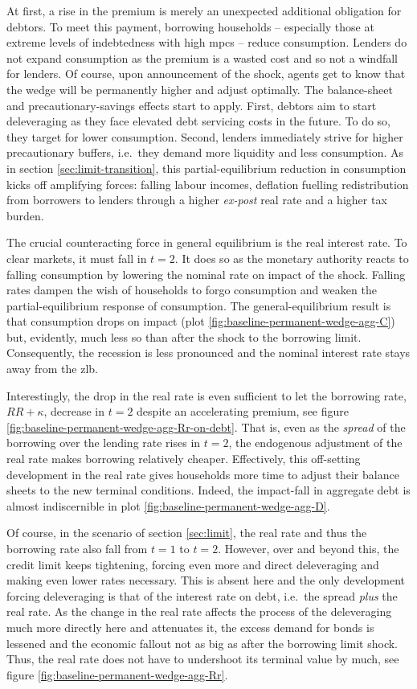 \documentclass[a4paper,12pt]{article} %
\numberwithin{equation}{section} %
\numberwithin{figure}{section}
\numberwithin{table}{section}
\begin{document}
At first, a rise in the premium is merely an unexpected additional obligation for debtors. To meet this payment, borrowing households -- especially those at extreme levels of indebtedness with high \Gls{mpc}s -- reduce consumption. Lenders do not expand consumption as the premium is a wasted cost and so not a windfall for lenders. Of course, upon announcement of the shock, agents get to know that the wedge will be permanently higher and adjust optimally. The balance-sheet and precautionary-savings effects start to apply. First, debtors aim to start deleveraging as they face elevated debt servicing costs in the future. To do so, they target for lower consumption. Second, lenders immediately strive for higher precautionary buffers, i.e.~they demand more liquidity and less consumption. As in section \ref{sec:limit-transition}, this partial-equilibrium reduction in consumption kicks off amplifying forces: falling labour incomes, deflation fuelling redistribution from borrowers to lenders through a higher \textit{ex-post} real rate and a higher tax burden. 

The crucial counteracting force in general equilibrium is the real interest rate. To clear markets, it must fall in $t=2$. It does so as the monetary authority reacts to falling consumption by lowering the nominal rate on impact of the shock. Falling rates dampen the wish of households to forgo consumption and weaken the partial-equilibrium response of consumption. The general-equilibrium result is that consumption drops on impact (plot \ref{fig:baseline-permanent-wedge-agg-C}) but, evidently, much less so than after the shock to the borrowing limit. Consequently, the recession is less pronounced and the nominal interest rate stays away from the \Gls{zlb}. 

Interestingly, the drop in the real rate is even sufficient to let the borrowing rate, $RR + \kappa$, decrease in $t=2$ despite an accelerating premium, see figure \ref{fig:baseline-permanent-wedge-agg-Rr-on-debt}. That is, even as the \textit{spread} of the borrowing over the lending rate rises in $t=2$, the endogenous adjustment of the real rate makes borrowing relatively cheaper. Effectively, this off-setting development in the real rate gives households more time to adjust their balance sheets to the new terminal conditions. Indeed, the impact-fall in aggregate debt is almost indiscernible in plot \ref{fig:baseline-permanent-wedge-agg-D}. 

Of course, in the scenario of section \ref{sec:limit}, the real rate and thus the borrowing rate also fall from $t=1$ to $t=2$. However, over and beyond this, the credit limit keeps tightening, forcing even more and direct deleveraging and making even lower rates necessary. This is absent here and the only development forcing deleveraging is that of the interest rate on debt, i.e.~the spread \textit{plus} the real rate. As the change in the real rate affects the process of the deleveraging much more directly here and attenuates it, the excess demand for bonds is lessened and the economic fallout not as big as after the borrowing limit shock. Thus, the real rate does not have to undershoot its terminal value by much, see figure \ref{fig:baseline-permanent-wedge-agg-Rr}. 
\end{document}
